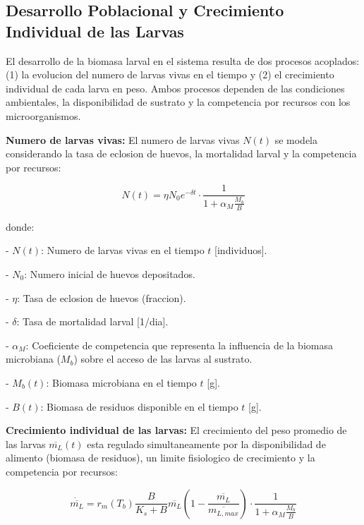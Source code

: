 \subsection{Desarrollo Poblacional y Crecimiento Individual de las Larvas}

El desarrollo de la biomasa larval en el sistema resulta de dos procesos acoplados: (1) la evolucion del numero de larvas vivas en el tiempo y (2) el crecimiento individual de cada larva en peso. Ambos procesos dependen de las condiciones ambientales, la disponibilidad de sustrato y la competencia por recursos con los microorganismos.

\vspace{1cm}
\textbf{Numero de larvas vivas:} El numero de larvas vivas $N(t)$ se modela considerando la tasa de eclosion de huevos, la mortalidad larval y la competencia por recursos:

\begin{equation}
N(t) = \eta N_0 e^{-\delta t} \cdot \frac{1}{1 + \alpha_M \frac{M_b}{B}}
\end{equation}

donde:

- $N(t)$: Numero de larvas vivas en el tiempo $t$ [individuos].

- $N_0$: Numero inicial de huevos depositados.

- $\eta$: Tasa de eclosion de huevos (fraccion).

- $\delta$: Tasa de mortalidad larval [1/dia].

- $\alpha_M$: Coeficiente de competencia que representa la influencia de la biomasa microbiana ($M_b$) sobre el acceso de las larvas al sustrato.

- $M_b(t)$: Biomasa microbiana en el tiempo $t$ [g].

- $B(t)$: Biomasa de residuos disponible en el tiempo $t$ [g].

\vspace{1cm}
\textbf{Crecimiento individual de las larvas:} El crecimiento del peso promedio de las larvas $\overline{m_L}(t)$ esta regulado simultaneamente por la disponibilidad de alimento (biomasa de residuos), un limite fisiologico de crecimiento y la competencia por recursos:

\begin{equation}
\dot{\overline{m_L}} = r_{m}(T_b) \frac{B}{K_s + B} \overline{m_L} \left( 1 - \frac{\overline{m_L}}{\overline{m_{L,max}}} \right) \cdot \frac{1}{1 + \alpha_M \frac{M_b}{B}}
\end{equation}

